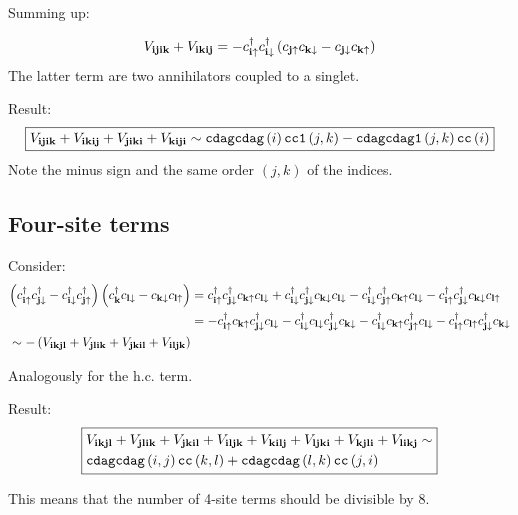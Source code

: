 \documentclass[12pt,paper=a4]{article}
\newcommand{\cdag}[1]{c^{\dagger}_{#1}}
\newcommand{\cUP}[1]{c_{#1\uparrow}}
\newcommand{\cdagUP}[1]{c^{\dagger}_{#1\uparrow}}
\newcommand{\cDN}[1]{c_{#1\downarrow}}
\newcommand{\cdagDN}[1]{c^{\dagger}_{#1\downarrow}}
\begin{document}
Summing up:

\begin{equation}
V_{\v{ijik}} + V_{\v{ikij}} 
= - \cdagUP{\v{i}}\cdagDN{\v{i}} \lr{ \cUP{\v{j}}\cDN{\v{k}} - \cDN{\v{j}}\cUP{\v{k}} } 
\end{equation}
The latter term are two annihilators coupled to a singlet.

Result:
\begin{equation}
\boxed{ 
V_{\mathbf{ijik}} + V_{\mathbf{ikij}} + V_{\mathbf{jiki}} + V_{\mathbf{kiji}} \sim \mathtt{cdagcdag}\left(i\right) \mathtt{cc1}\left(j,k\right) - \mathtt{cdagcdag1}\left(j,k\right) \mathtt{cc}\left(i\right)
}
\end{equation}
Note the minus sign and the same order $(j,k)$ of the indices.

\subsection{Four-site terms}

Consider:
\begin{equation}
\begin{split}
\lr{ \cdagUP{\v{i}}\cdagDN{\v{j}} - \cdagDN{\v{i}}\cdagUP{\v{j}} } 
\lr{ \cdag{\v{k}}\cDN{\v{l}} - \cDN{\v{k}}\cUP{\v{l}} }
&=
 \cdagUP{\v{i}} \cdagDN{\v{j}} \cUP{\v{k}} \cDN{\v{l}}
+\cdagDN{\v{i}} \cdagDN{\v{j}} \cDN{\v{k}} \cDN{\v{l}}
-\cdagDN{\v{i}} \cdagUP{\v{j}} \cUP{\v{k}} \cDN{\v{l}}
-\cdagUP{\v{i}} \cdagDN{\v{j}} \cDN{\v{k}} \cUP{\v{l}}\\
&= 
-\cdagUP{\v{i}} \cUP{\v{k}} \cdagDN{\v{j}} \cDN{\v{l}}
-\cdagDN{\v{i}} \cDN{\v{l}} \cdagDN{\v{j}} \cDN{\v{k}} 
-\cdagDN{\v{i}} \cUP{\v{k}} \cdagUP{\v{j}} \cDN{\v{l}}
-\cdagUP{\v{i}} \cUP{\v{l}} \cdagDN{\v{j}} \cDN{\v{k}}\\
\sim -\lr{ V_{\v{ikjl}} + V_{\v{jlik}} + V_{\v{jkil}} + V_{\v{iljk}} }
\end{split}
\end{equation}

Analogously for the h.c. term.

Result:
\begin{equation}
\boxed{
\begin{split} 
 &V_{\mathbf{ikjl}} + V_{\mathbf{jlik}} + V_{\mathbf{jkil}} + V_{\mathbf{iljk}}+V_{\mathbf{kilj}} + V_{\mathbf{ljki}} + V_{\mathbf{kjli}} + V_{\mathbf{likj}}
\sim \\
&\mathtt{cdagcdag}\left(i,j\right) \mathtt{cc}\left(k,l\right) + \mathtt{cdagcdag}\left(l,k\right) \mathtt{cc}\left(j,i\right)
\end{split}
}
\end{equation}

This means that the number of 4-site terms should be divisible by 8.
\end{document}
